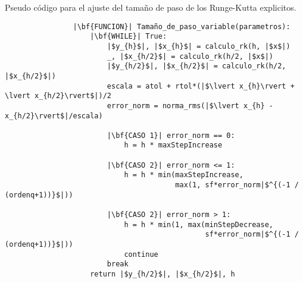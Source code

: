         \pagebreak

        \begin{longlisting}
            \caption[Pseudo código - Runge-Kutta explicitos]{Pseudo código para el ajuste del tamaño de paso de los Runge-Kutta explicitos.}
            \label{code:stepexplicito}				
            \begin{verbatim}
                |\bf{FUNCION}| Tamaño_de_paso_variable(parametros):
                    |\bf{WHILE}| True:
                        |$y_{h}$|, |$x_{h}$| = calculo_rk(h, |$x$|)
                        _, |$x_{h/2}$| = calculo_rk(h/2, |$x$|)
                        |$y_{h/2}$|, |$x_{h/2}$| = calculo_rk(h/2, |$x_{h/2}$|)
                        escala = atol + rtol*(|$\lvert x_{h}\rvert + \lvert x_{h/2}\rvert$|)/2
                        error_norm = norma_rms(|$\lvert x_{h} - x_{h/2}\rvert$|/escala)
                        
                        |\bf{CASO 1}| error_norm == 0:
                            h = h * maxStepIncrease
                        
                        |\bf{CASO 2}| error_norm <= 1:
                            h = h * min(maxStepIncrease,
                                        max(1, sf*error_norm|$^{(-1 / (ordenq+1))}$|))
                        
                        |\bf{CASO 2}| error_norm > 1:
                            h = h * min(1, max(minStepDecrease, 
                                               sf*error_norm|$^{(-1 / (ordenq+1))}$|))
                            continue
                        break
                    return |$y_{h/2}$|, |$x_{h/2}$|, h
            \end{verbatim}
        \end{longlisting}

